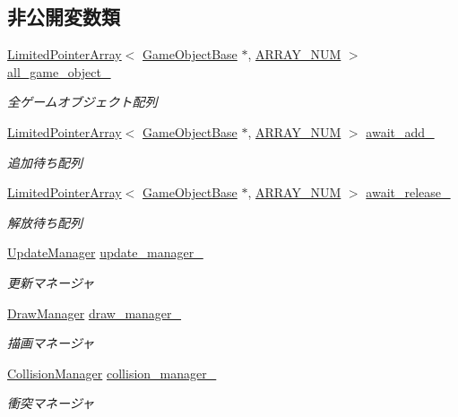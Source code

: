 \subsection*{非公開変数類}
\begin{DoxyCompactItemize}
\item 
\mbox{\hyperlink{class_limited_pointer_array}{Limited\+Pointer\+Array}}$<$ \mbox{\hyperlink{class_game_object_base}{Game\+Object\+Base}} $\ast$, \mbox{\hyperlink{class_game_object_manager_a591934d64d750c10c03c908371470681}{A\+R\+R\+A\+Y\+\_\+\+N\+UM}} $>$ \mbox{\hyperlink{class_game_object_manager_a6bde8822fae64e488627addb70c32182}{all\+\_\+game\+\_\+object\+\_\+}}
\begin{DoxyCompactList}\small\item\em 全ゲームオブジェクト配列 \end{DoxyCompactList}\item 
\mbox{\hyperlink{class_limited_pointer_array}{Limited\+Pointer\+Array}}$<$ \mbox{\hyperlink{class_game_object_base}{Game\+Object\+Base}} $\ast$, \mbox{\hyperlink{class_game_object_manager_a591934d64d750c10c03c908371470681}{A\+R\+R\+A\+Y\+\_\+\+N\+UM}} $>$ \mbox{\hyperlink{class_game_object_manager_a80f815a873b36d918b3fc93b8f2ca043}{await\+\_\+add\+\_\+}}
\begin{DoxyCompactList}\small\item\em 追加待ち配列 \end{DoxyCompactList}\item 
\mbox{\hyperlink{class_limited_pointer_array}{Limited\+Pointer\+Array}}$<$ \mbox{\hyperlink{class_game_object_base}{Game\+Object\+Base}} $\ast$, \mbox{\hyperlink{class_game_object_manager_a591934d64d750c10c03c908371470681}{A\+R\+R\+A\+Y\+\_\+\+N\+UM}} $>$ \mbox{\hyperlink{class_game_object_manager_a4fd19d389327c8d414c6375eee223d8a}{await\+\_\+release\+\_\+}}
\begin{DoxyCompactList}\small\item\em 解放待ち配列 \end{DoxyCompactList}\item 
\mbox{\hyperlink{class_update_manager}{Update\+Manager}} \mbox{\hyperlink{class_game_object_manager_a330c1759e1a075fb257a01c6f48cf9f3}{update\+\_\+manager\+\_\+}}
\begin{DoxyCompactList}\small\item\em 更新マネージャ \end{DoxyCompactList}\item 
\mbox{\hyperlink{class_draw_manager}{Draw\+Manager}} \mbox{\hyperlink{class_game_object_manager_afad3b0a750982e55d71edd72b440c724}{draw\+\_\+manager\+\_\+}}
\begin{DoxyCompactList}\small\item\em 描画マネージャ \end{DoxyCompactList}\item 
\mbox{\hyperlink{class_collision_manager}{Collision\+Manager}} \mbox{\hyperlink{class_game_object_manager_a3a173415abbd4acbe2abaf40e0a6c1b8}{collision\+\_\+manager\+\_\+}}
\begin{DoxyCompactList}\small\item\em 衝突マネージャ \end{DoxyCompactList}\end{DoxyCompactItemize}
